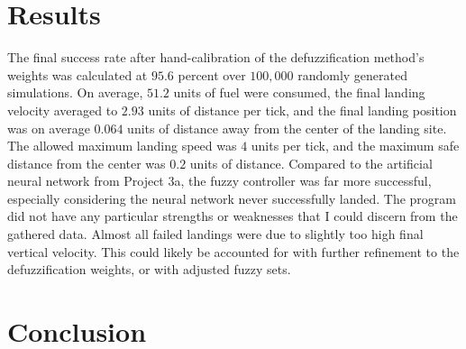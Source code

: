 \documentclass[12pt, article]{scrartcl}
\begin{document}
\section{Results}
The final success rate after hand-calibration of the defuzzification method's weights was calculated at $95.6$ percent over $100,000$ randomly generated simulations. On average, $51.2$ units of fuel were consumed, the final landing velocity averaged to $2.93$ units of distance per tick, and the final landing position was on average $0.064$ units of distance away from the center of the landing site. The allowed maximum landing speed was $4$ units per tick, and the maximum safe distance from the center was $0.2$ units of distance. Compared to the artificial neural network from Project 3a, the fuzzy controller was far more successful, especially considering the neural network never successfully landed. The program did not have any particular strengths or weaknesses that I could discern from the gathered data. Almost all failed landings were due to slightly too high final vertical velocity. This could likely be accounted for with further refinement to the defuzzification weights, or with adjusted fuzzy sets.
\section{Conclusion}
\end{document}
